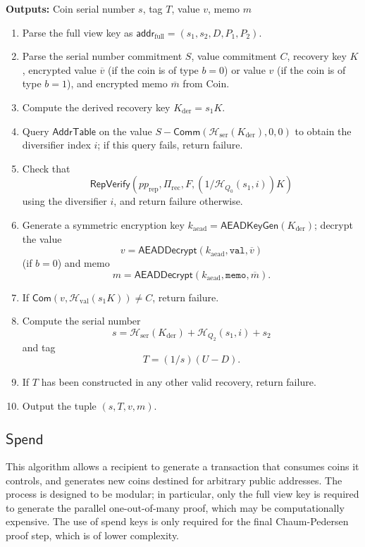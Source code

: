 \documentclass{llncs}
\newcommand{\hash}{\mathcal{H}}
\newcommand{\func}[1]{\mathsf{#1}}
\newcommand{\addr}{\func{addr}}
\newcommand{\com}{\func{Com}}
\newcommand{\comm}{\func{Comm}}
\begin{document}
\textbf{Outputs:} Coin serial number $s$, tag $T$, value $v$, memo $m$

\begin{enumerate}
\item Parse the full view key as $\addr_{\text{full}} = (s_1, s_2, D, P_1, P_2)$.
\item Parse the serial number commitment $S$, value commitment $C$, recovery key $K$, encrypted value $\overline{v}$ (if the coin is of type $b=0$) or value $v$ (if the coin is of type $b=1$), and encrypted memo $\overline{m}$ from $\text{Coin}$.
\item Compute the derived recovery key $K_{\text{der}} = s_1 K$.
\item Query $\func{AddrTable}$ on the value $S - \comm(\hash_{\text{ser}}(K_{\text{der}}),0,0)$ to obtain the diversifier index $i$; if this query fails, return failure.
\item Check that $$\func{RepVerify}(pp_{\text{rep}},\Pi_{\text{rec}},F,(1/\hash_{Q_0}(s_1,i))K)$$ using the diversifier $i$, and return failure otherwise.
\item Generate a symmetric encryption key $k_{\text{aead}} = \func{AEADKeyGen}(K_{\text{der}})$; decrypt the value $$v = \func{AEADDecrypt}(k_{\text{aead}},\texttt{val},\overline{v})$$ (if $b=0$) and memo $$m = \func{AEADDecrypt}(k_{\text{aead}},\texttt{memo},\overline{m}).$$
\item If $\com(v,\hash_{\text{val}}(s_1 K)) \neq C$, return failure.
\item Compute the serial number $$s = \hash_{\text{ser}}(K_{\text{der}}) + \hash_{Q_2}(s_1,i) + s_2$$ and tag $$T = (1/s)(U - D).$$
\item If $T$ has been constructed in any other valid recovery, return failure.
\item Output the tuple $(s, T, v, m)$.
\end{enumerate}


\subsection{\texorpdfstring{$\func{Spend}$}{Spend}}

This algorithm allows a recipient to generate a transaction that consumes coins it controls, and generates new coins destined for arbitrary public addresses.
The process is designed to be modular; in particular, only the full view key is required to generate the parallel one-out-of-many proof, which may be computationally expensive.
The use of spend keys is only required for the final Chaum-Pedersen proof step, which is of lower complexity.
\end{document}
